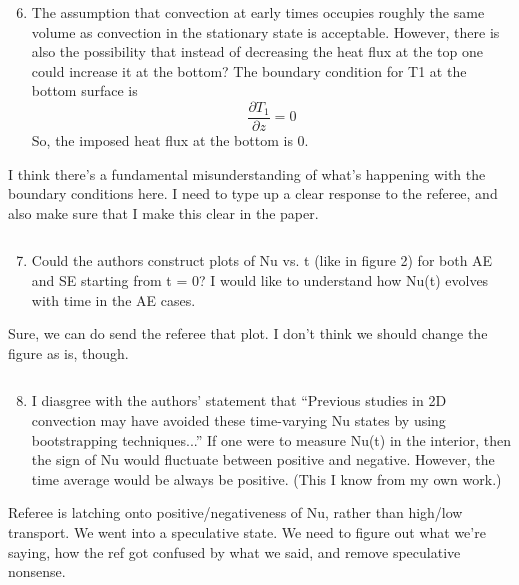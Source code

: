 \documentclass[aps, 11pt, singlecolumn]{revtex4-1} %
\begin{document}
\begin{singlespace}
\begin{myquotation}
$\,$\\\vspace{-1.25cm}
\begin{enumerate}
\setcounter{enumi}{5}
\item The assumption that convection at early times occupies roughly the same volume as convection in the stationary state is acceptable. However, there is also the possibility that instead of decreasing the heat flux at the top one could increase it at the bottom? The boundary condition for T1 at the bottom surface is
$$
\frac{\partial T_1}{\partial z} = 0
$$
So, the imposed heat flux at the bottom is 0.
\end{enumerate}
\end{myquotation}
I think there's a fundamental misunderstanding of what's happening with the boundary conditions here. I need to type up a clear response to the referee, and also make sure that I make this clear in the paper.
\begin{myquotation}
$\,$\\\vspace{-1.25cm}
\begin{enumerate}
\setcounter{enumi}{6}
\item Could the authors construct plots of Nu vs. t (like in figure 2) for both AE and SE starting from t = 0? I would like to understand how Nu(t) evolves with time in the AE cases.
\end{enumerate}
\end{myquotation}
Sure, we can do send the referee that plot. I don't think we should change the 
figure as is, though.
\begin{myquotation}
$\,$\\\vspace{-1.25cm}
\begin{enumerate}
\setcounter{enumi}{7}
\item I diasgree with the authors’ statement that “Previous studies in 2D convection may have avoided these time-varying Nu states by using bootstrapping techniques...” If one were to measure Nu(t) in the interior, then the sign of Nu would fluctuate between positive and negative. However, the time average would be always be positive. (This I know from my own work.)
\end{enumerate}
\end{myquotation}
Referee is latching onto positive/negativeness of Nu, rather than high/low transport.
We went into a speculative state. We need to figure out what we're saying, how the ref got confused by what we said, and remove speculative nonsense.

\end{singlespace}
\end{document}
